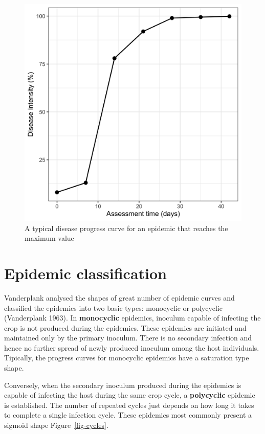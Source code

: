 \documentclass[
  letterpaper,
  DIV=11,
  numbers=noendperiod]{scrreprt}
\begin{document}
\begin{figure}

{\centering \includegraphics{imgs/dpc1.png}

}

\caption{\label{fig-dpc1}A typical disease progress curve for an
epidemic that reaches the maximum value}

\end{figure}

\hypertarget{epidemic-classification}{%
\section{Epidemic classification}\label{epidemic-classification}}

Vanderplank analysed the shapes of great number of epidemic curves and
classified the epidemics into two basic types: monocyclic or polycyclic
(Vanderplank 1963). In \textbf{monocyclic} epidemics, inoculum capable
of infecting the crop is not produced during the epidemics. These
epidemics are initiated and maintained only by the primary inoculum.
There is no secondary infection and hence no further spread of newly
produced inoculum among the host individuals. Tipically, the progress
curves for monocyclic epidemics have a saturation type shape.

Conversely, when the secondary inoculum produced during the epidemics is
capable of infecting the host during the same crop cycle, a
\textbf{polycyclic} epidemic is established. The number of repeated
cycles just depends on how long it takes to complete a single infection
cycle. These epidemics most commonly present a sigmoid shape
Figure~\ref{fig-cycles}.
\end{document}
